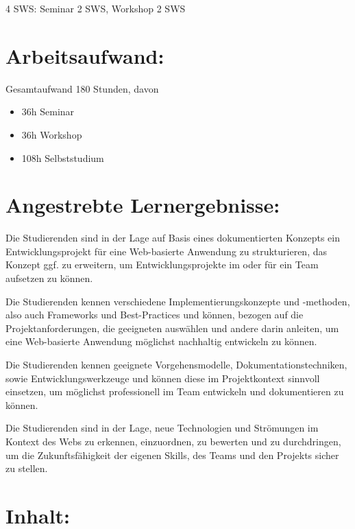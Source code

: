 4 SWS: Seminar 2 SWS, Workshop 2 SWS

\section*{Arbeitsaufwand:\label{/mi-2017/modulbeschreibungen-master/MA_WTW_Modul_Web-Technologien}}\label{arbeitsaufwandpathlabelmi-2017modulbeschreibungen-mastermaux5fwtwux5fmodulux5fweb-technologien}

Gesamtaufwand 180 Stunden, davon

\begin{itemize}
\tightlist
\item
  36h Seminar
\item
  36h Workshop
\item
  108h Selbststudium
\end{itemize}

\section*{Angestrebte
Lernergebnisse:\label{/mi-2017/modulbeschreibungen-master/MA_WTW_Modul_Web-Technologien}}\label{angestrebte-lernergebnissepathlabelmi-2017modulbeschreibungen-mastermaux5fwtwux5fmodulux5fweb-technologien}

Die Studierenden sind in der Lage auf Basis eines dokumentierten
Konzepts ein Entwicklungsprojekt für eine Web-basierte Anwendung zu
strukturieren, das Konzept ggf. zu erweitern, um Entwicklungsprojekte im
oder für ein Team aufsetzen zu können.

Die Studierenden kennen verschiedene Implementierungskonzepte und
-methoden, also auch Frameworks und Best-Practices und können, bezogen
auf die Projektanforderungen, die geeigneten auswählen und andere darin
anleiten, um eine Web-basierte Anwendung möglichst nachhaltig entwickeln
zu können.

Die Studierenden kennen geeignete Vorgehensmodelle,
Dokumentationstechniken, sowie Entwicklungswerkzeuge und können diese im
Projektkontext sinnvoll einsetzen, um möglichst professionell im Team
entwickeln und dokumentieren zu können.

Die Studierenden sind in der Lage, neue Technologien und Strömungen im
Kontext des Webs zu erkennen, einzuordnen, zu bewerten und zu
durchdringen, um die Zukunftsfähigkeit der eigenen Skills, des Teams und
den Projekts sicher zu stellen.

\section*{Inhalt:\label{/mi-2017/modulbeschreibungen-master/MA_WTW_Modul_Web-Technologien}}\label{inhaltpathlabelmi-2017modulbeschreibungen-mastermaux5fwtwux5fmodulux5fweb-technologien}

